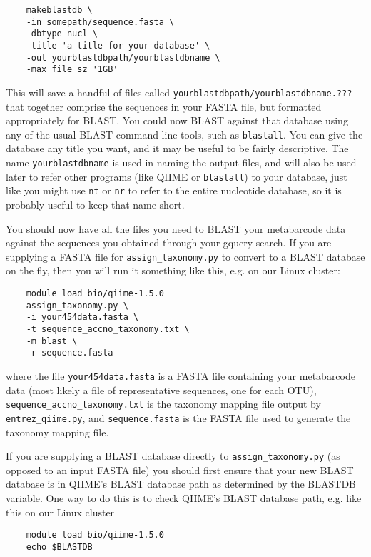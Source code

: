 \documentclass[11pt]{amsart}
\begin{document}
\begin{verbatim}
    makeblastdb \
    -in somepath/sequence.fasta \
    -dbtype nucl \
    -title 'a title for your database' \
    -out yourblastdbpath/yourblastdbname \
    -max_file_sz '1GB'
\end{verbatim}

This will save a handful of files called \verb|yourblastdbpath/yourblastdbname.???| that together comprise the sequences in your FASTA file, but formatted appropriately for BLAST. You could now BLAST against that database using any of the usual BLAST command line tools, such as \verb|blastall|. You can give the database any title you want, and it may be useful to be fairly descriptive. The name \verb|yourblastdbname| is used in naming the output files, and will also be used later to refer other programs (like QIIME or \verb|blastall|) to your database, just like you might use \verb|nt| or \verb|nr| to refer to the entire nucleotide database, so it is probably useful to keep that name short.


You should now have all the files you need to BLAST your metabarcode data against the sequences you obtained through your gquery search. If you are supplying a FASTA file for \verb|assign_taxonomy.py| to convert to a BLAST database on the fly, then you will run it something like this, e.g. on our Linux cluster:

\begin{verbatim}
    module load bio/qiime-1.5.0
    assign_taxonomy.py \
    -i your454data.fasta \
    -t sequence_accno_taxonomy.txt \
    -m blast \
    -r sequence.fasta
\end{verbatim}

where the file \verb|your454data.fasta| is a FASTA file containing your metabarcode data (most likely a file of representative sequences, one for each OTU), \verb|sequence_accno_taxonomy.txt| is the taxonomy mapping file output by \verb|entrez_qiime.py|, and \verb|sequence.fasta| is the FASTA file used to generate the taxonomy mapping file.

If you are supplying a BLAST database directly to \verb|assign_taxonomy.py| (as opposed to an input FASTA file) you should first ensure that your new BLAST database is in QIIME's BLAST database path as determined by the BLASTDB variable. One way to do this is to check QIIME's BLAST database path, e.g. like this on our Linux cluster

\begin{verbatim}
    module load bio/qiime-1.5.0
    echo $BLASTDB
\end{verbatim}
\end{document}
